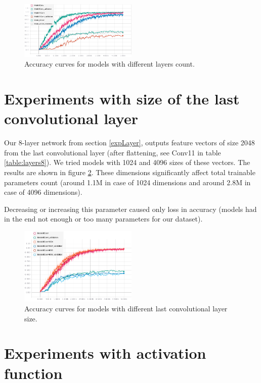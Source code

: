 \documentclass[a4paper]{article}
\begin{document}
\begin{figure}[!h]
    \centering
    \includegraphics[page=2,width=0.5\textwidth]{curvesLayers.png}
    \caption[]{Accuracy curves for models with different layers count.
    \label{fig:layersAcc}
   	}
\end{figure}

\section{Experiments with size of the last convolutional layer}

Our 8-layer network from section \ref{expLayer}, outputs
feature vectors of size 2048 from the last convolutional layer (after flattening, see Conv11 in table \ref{table:layers8}).
We tried models with 1024 and 4096 sizes of these vectors.
The results are shown in figure \ref{fig:lastSize}.
These dimensions significantly affect total trainable parameters count
(around 1.1M in case of 1024 dimensions and around 2.8M in case of 4096 dimensions).

Decreasing or increasing this parameter caused only loss in accuracy
(models had in the end not enough or too many parameters for our dataset).

\begin{figure}[!h]
    \centering
    \includegraphics[page=2,width=0.5\textwidth]{lastConvSize.png}
    \caption[]{Accuracy curves for models with different last convolutional layer size.
    \label{fig:lastSize}
    }
\end{figure}


\section{Experiments with activation function}
\end{document}
